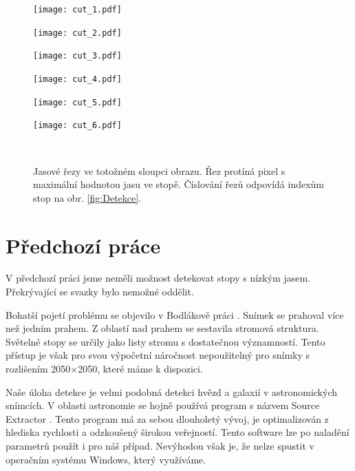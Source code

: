 \newcommand\x{4}
\newcommand\xx{0,155}

\begin{figure}[h!]
    \centering
    \begin{minipage}[c]{0.163\textwidth}
        \centering\texttt{[image: cut\_1.pdf]}
    \end{minipage}
    \begin{minipage}[c]{\xx \textwidth}
        \centering\texttt{[image: cut\_2.pdf]}
    \end{minipage}
    \begin{minipage}[c]{\xx \textwidth}
        \centering\texttt{[image: cut\_3.pdf]}
    \end{minipage}
    \begin{minipage}[c]{\xx \textwidth}
        \centering\texttt{[image: cut\_4.pdf]}
    \end{minipage}
    \begin{minipage}[c]{\xx \textwidth}
        \centering\texttt{[image: cut\_5.pdf]}
    \end{minipage}
    \begin{minipage}[c]{\xx \textwidth}
        \centering\texttt{[image: cut\_6.pdf]}
    \end{minipage}
    \\
        \caption[Jasové řezy.]{Jasové řezy ve totožném sloupci obrazu. Řez protíná pixel s maximální hodnotou jasu ve stopě. Číslování řezů odpovídá indexům stop na obr. \ref{fig:Detekce}.}
        \label{fig:rezy}
\end{figure}


\section{Předchozí práce}

V předchozí práci \cite{Drapela} jsme neměli možnost detekovat stopy s nízkým jasem. Překrývající se svazky bylo nemožné oddělit.  

Bohatší pojetí problému se objevilo v Bodlákově práci \cite{Bodlak2005}. Snímek se prahoval více než jedním prahem. Z oblastí nad prahem se sestavila stromová struktura. Světelné stopy se určily jako listy stromu s dostatečnou významností. Tento přístup je však pro svou výpočetní náročnost nepoužitelný pro snímky s rozlišením 2050$\times$2050, které máme k dispozici. 

Naše úloha detekce je velmi podobná detekci hvězd a galaxií v astronomických snímcích. V oblasti astronomie se hojně používá program s názvem Source Extractor \cite{SEXarticle}. Tento program má za sebou dlouholetý vývoj, je optimalizován z hlediska rychlosti a odzkoušený širokou veřejností. Tento software lze po naladění parametrů použít i pro náš případ. Nevýhodou však je, že nelze spustit v operačním systému Windows, který využíváme.  

